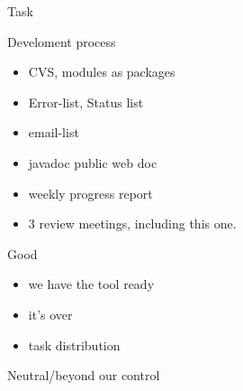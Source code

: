 


\begin{myslide}{Task}
  
\end{myslide}


\begin{myslide}{Develoment process}
  \begin{itemize}
  \item CVS, modules as packages
  \item Error-list, Status list
  \item email-list
  \item javadoc public web doc
  \item weekly progress report
  \item 3 review meetings, including this one. 
  \end{itemize}
\end{myslide}


\begin{myslide}{Good}
  \begin{itemize}
  \item we have the tool ready
  \item it's over
  \item task distribution
  \end{itemize}
  
\end{myslide}
\begin{myslide}{Neutral/beyond our control}
  
\end{myslide}

